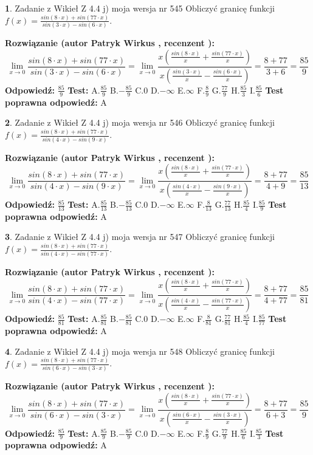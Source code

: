 \documentclass[12pt, a4paper]{article}
\theoremstyle{definition} %
\newtheorem{zad}{}
\newcommand{\zadStart}[1]{\begin{zad}#1\newline}
\newcommand{\zadStop}{\end{zad}}
\newcommand{\rozwStart}[2]{\noindent \textbf{Rozwiązanie (autor #1 , recenzent #2): }\newline}
\newcommand{\rozwStop}{\newline}
\newcommand{\odpStart}{\noindent \textbf{Odpowiedź:}\newline}
\newcommand{\odpStop}{\newline}
\newcommand{\testStart}{\noindent \textbf{Test:}\newline}
\newcommand{\testStop}{\newline}
\newcommand{\kluczStart}{\noindent \textbf{Test poprawna odpowiedź:}\newline}
\newcommand{\kluczStop}{\newline}
\begin{document}
\zadStart{Zadanie z Wikieł Z 4.4 j) moja wersja nr 545}
Obliczyć granicę funkcji $f(x)=\frac{sin(8\cdot x) +sin(77\cdot x)}{sin(3\cdot x) -sin(6\cdot x)}$.
\zadStop
\rozwStart{Patryk Wirkus}{}
$$\lim\limits_{x\to 0}\frac{sin(8\cdot x) +sin(77\cdot x)}{sin(3\cdot x) -sin(6\cdot x)}=\lim\limits_{x\to 0}\frac{x(\frac{sin(8\cdot x)}{x}+\frac{sin(77\cdot x)}{x})}{x(\frac{sin(3\cdot x)}{x}-\frac{sin(6\cdot x)}{x})}=\frac{8+77}{3+6} = \frac{85}{9}$$
\rozwStop
\odpStart
$\frac{85}{9}$
\odpStop
\testStart
A.$\frac{85}{9}$
B.$-\frac{85}{9}$
C.$0$
D.$-\infty$
E.$\infty$
F.$\frac{8}{9}$
G.$\frac{77}{9}$
H.$\frac{85}{3}$
I.$\frac{85}{6}$
\testStop
\kluczStart
A
\kluczStop



\zadStart{Zadanie z Wikieł Z 4.4 j) moja wersja nr 546}
Obliczyć granicę funkcji $f(x)=\frac{sin(8\cdot x) +sin(77\cdot x)}{sin(4\cdot x) -sin(9\cdot x)}$.
\zadStop
\rozwStart{Patryk Wirkus}{}
$$\lim\limits_{x\to 0}\frac{sin(8\cdot x) +sin(77\cdot x)}{sin(4\cdot x) -sin(9\cdot x)}=\lim\limits_{x\to 0}\frac{x(\frac{sin(8\cdot x)}{x}+\frac{sin(77\cdot x)}{x})}{x(\frac{sin(4\cdot x)}{x}-\frac{sin(9\cdot x)}{x})}=\frac{8+77}{4+9} = \frac{85}{13}$$
\rozwStop
\odpStart
$\frac{85}{13}$
\odpStop
\testStart
A.$\frac{85}{13}$
B.$-\frac{85}{13}$
C.$0$
D.$-\infty$
E.$\infty$
F.$\frac{8}{13}$
G.$\frac{77}{13}$
H.$\frac{85}{4}$
I.$\frac{85}{9}$
\testStop
\kluczStart
A
\kluczStop



\zadStart{Zadanie z Wikieł Z 4.4 j) moja wersja nr 547}
Obliczyć granicę funkcji $f(x)=\frac{sin(8\cdot x) +sin(77\cdot x)}{sin(4\cdot x) -sin(77\cdot x)}$.
\zadStop
\rozwStart{Patryk Wirkus}{}
$$\lim\limits_{x\to 0}\frac{sin(8\cdot x) +sin(77\cdot x)}{sin(4\cdot x) -sin(77\cdot x)}=\lim\limits_{x\to 0}\frac{x(\frac{sin(8\cdot x)}{x}+\frac{sin(77\cdot x)}{x})}{x(\frac{sin(4\cdot x)}{x}-\frac{sin(77\cdot x)}{x})}=\frac{8+77}{4+77} = \frac{85}{81}$$
\rozwStop
\odpStart
$\frac{85}{81}$
\odpStop
\testStart
A.$\frac{85}{81}$
B.$-\frac{85}{81}$
C.$0$
D.$-\infty$
E.$\infty$
F.$\frac{8}{81}$
G.$\frac{77}{81}$
H.$\frac{85}{4}$
I.$\frac{85}{77}$
\testStop
\kluczStart
A
\kluczStop



\zadStart{Zadanie z Wikieł Z 4.4 j) moja wersja nr 548}
Obliczyć granicę funkcji $f(x)=\frac{sin(8\cdot x) +sin(77\cdot x)}{sin(6\cdot x) -sin(3\cdot x)}$.
\zadStop
\rozwStart{Patryk Wirkus}{}
$$\lim\limits_{x\to 0}\frac{sin(8\cdot x) +sin(77\cdot x)}{sin(6\cdot x) -sin(3\cdot x)}=\lim\limits_{x\to 0}\frac{x(\frac{sin(8\cdot x)}{x}+\frac{sin(77\cdot x)}{x})}{x(\frac{sin(6\cdot x)}{x}-\frac{sin(3\cdot x)}{x})}=\frac{8+77}{6+3} = \frac{85}{9}$$
\rozwStop
\odpStart
$\frac{85}{9}$
\odpStop
\testStart
A.$\frac{85}{9}$
B.$-\frac{85}{9}$
C.$0$
D.$-\infty$
E.$\infty$
F.$\frac{8}{9}$
G.$\frac{77}{9}$
H.$\frac{85}{6}$
I.$\frac{85}{3}$
\testStop
\kluczStart
A
\kluczStop
\end{document}

